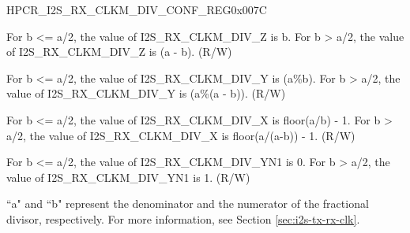\begin{register}{H}{PCR\_I2S\_RX\_CLKM\_DIV\_CONF\_REG}{0x007C}\label{regdesc:PCRI2SRXCLKMDIVCONFREG}
%
%
%
%
%
\regnewline%
\begin{regdesc}\begin{reglist}
\label{fielddesc:PCRI2SRXCLKMDIVZ}\item [PCR\_I2S\_RX\_CLKM\_DIV\_Z] For b <= a/2, the value of I2S\_RX\_CLKM\_DIV\_Z is b. For b > a/2, the value of I2S\_RX\_CLKM\_DIV\_Z is (a - b). (R/W)
\label{fielddesc:PCRI2SRXCLKMDIVY}\item [PCR\_I2S\_RX\_CLKM\_DIV\_Y] For b <= a/2, the value of I2S\_RX\_CLKM\_DIV\_Y is (a\%b). For b > a/2, the value of I2S\_RX\_CLKM\_DIV\_Y is (a\%(a - b)). (R/W)
\label{fielddesc:PCRI2SRXCLKMDIVX}\item [PCR\_I2S\_RX\_CLKM\_DIV\_X] For b <= a/2, the value of I2S\_RX\_CLKM\_DIV\_X is floor(a/b) - 1. For b > a/2, the value of I2S\_RX\_CLKM\_DIV\_X is floor(a/(a-b)) - 1. (R/W)
\label{fielddesc:PCRI2SRXCLKMDIVYN1}\item [PCR\_I2S\_RX\_CLKM\_DIV\_YN1] For b <= a/2, the value of I2S\_RX\_CLKM\_DIV\_YN1 is 0. For b > a/2, the value of I2S\_RX\_CLKM\_DIV\_YN1 is 1. (R/W)
\end{reglist}\end{regdesc}
\vspace{-2em}
\begin{tiplisting}
``a" and ``b" represent the denominator and the numerator of the fractional divisor, respectively. For more information, see Section \ref{sec:i2s-tx-rx-clk}.
\end{tiplisting}
\end{register}




